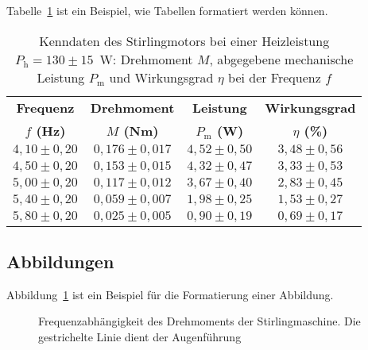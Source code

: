 \documentclass[a4paper,11pt]{article}
\begin{document}
Tabelle~\ref{tab:Beispiel} ist ein Beispiel, wie Tabellen formatiert
werden können.
\begin{table}
\begin{center}
\begin{tabular}{cccc}
\hline
\textbf{Frequenz} & \textbf{Drehmoment}
           & \textbf{Leistung} & \textbf{Wirkungsgrad} \\
\textbf{$f$ (Hz)} & \textbf{$M$ (Nm)}
           & \textbf{$P_\mathrm{m}$ (W)} & \textbf{$\eta$ (\%)} \\ \hline
$4,10\pm 0,20$ & $0,176\pm 0,017$ & $4,52\pm 0,50$ & $3,48\pm 0,56$ \\
$4,50\pm 0,20$ & $0,153\pm 0,015$ & $4,32\pm 0,47$ & $3,33\pm 0,53$ \\
$5,00\pm 0,20$ & $0,117\pm 0,012$ & $3,67\pm 0,40$ & $2,83\pm 0,45$ \\
$5,40\pm 0,20$ & $0,059\pm 0,007$ & $1,98\pm 0,25$ & $1,53\pm 0,27$ \\
$5,80\pm 0,20$ & $0,025\pm 0,005$ & $0,90\pm 0,19$ & $0,69\pm 0,17$ \\ \hline
\end{tabular}
\caption{\label{tab:Beispiel}Kenndaten des Stirlingmotors bei einer Heizleistung
    $P_\mathrm{h}=130\pm 15$~W: Drehmoment $M$, abgegebene mechanische Leistung
    $P_\mathrm{m}$ und Wirkungsgrad $\eta$ bei der Frequenz $f$}
\end{center}
\end{table}



\subsection{Abbildungen}
Abbildung~\ref{abb:beispiel} ist ein Beispiel für die Formatierung
einer Abbildung.
\begin{figure}[t]
\begin{center}
\caption{Frequenzabhängigkeit des Drehmoments der Stirlingmaschine.
Die gestrichelte Linie dient der Augenführung}\label{abb:beispiel}
\end{center}
\end{figure}
\end{document}
